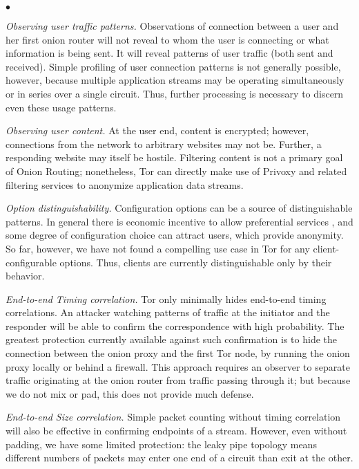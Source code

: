 \documentclass[times,10pt,twocolumn]{article}
\newenvironment{tightlist}{\begin{list}{$\bullet$}{
  \setlength{\itemsep}{0mm}
    \setlength{\parsep}{0mm}
    }}{\end{list}}
\begin{document}
\begin{tightlist}
\item \emph{Observing user traffic patterns.} Observations of connection
  between a user and her first onion router will not reveal to whom
  the user is connecting or what information is being sent. It will
  reveal patterns of user traffic (both sent and received). Simple
  profiling of user connection patterns is not generally possible,
  however, because multiple application streams may be operating
  simultaneously or in series over a single circuit. Thus, further
  processing is necessary to discern even these usage patterns.
  
\item \emph{Observing user content.} At the user end, content is
  encrypted; however, connections from the network to arbitrary
  websites may not be. Further, a responding website may itself be
  hostile. Filtering content is not a primary goal of
  Onion Routing; nonetheless, Tor can directly make use of Privoxy and
  related filtering services to anonymize application data streams.

\item \emph{Option distinguishability.} Configuration options can be a
  source of distinguishable patterns. In general there is economic
  incentive to allow preferential services \cite{econymics}, and some
  degree of configuration choice can attract users, which
  provide anonymity.  So far, however, we have
  not found a compelling use case in Tor for any client-configurable
  options.  Thus, clients are currently distinguishable only by their
  behavior.
  
\item \emph{End-to-end Timing correlation.}  Tor only minimally hides
  end-to-end timing correlations. An attacker watching patterns of
  traffic at the initiator and the responder will be
  able to confirm the correspondence with high probability. The
  greatest protection currently available against such confirmation is to hide
  the connection between the onion proxy and the first Tor node,
  by running the onion proxy locally or 
  behind a firewall.  This approach
  requires an observer to separate traffic originating at the onion
  router from traffic passing through it; but because we do not mix
  or pad, this does not provide much defense.
  
\item \emph{End-to-end Size correlation.} Simple packet counting
  without timing correlation will also be effective in confirming
  endpoints of a stream. However, even without padding, we have some
  limited protection: the leaky pipe topology means different numbers
  of packets may enter one end of a circuit than exit at the other.
  

\end{tightlist}
\end{document}
